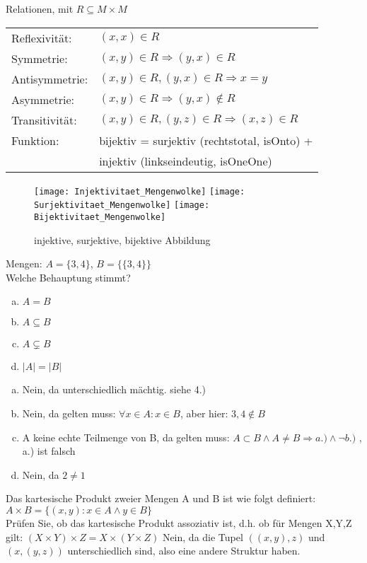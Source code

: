 \begin{card}
	Relationen, mit $R \subseteq M \times M$\\
	\begin{tabular}{ll}
		Reflexivität:& $(x, x) \in R $\\
		Symmetrie:&	$(x, y) \in R \Rightarrow (y, x) \in R$\\
		Antisymmetrie:& $(x, y) \in R, (y, x) \in R \Rightarrow x=y$\\
		Asymmetrie:& $(x, y) \in R \Rightarrow (y, x) \notin R$\\
		Transitivität:& $(x, y) \in R, (y, z) \in R \Rightarrow (x, z) \in R$\\
		Funktion: & bijektiv = surjektiv (rechtstotal, isOnto) +\\
	     	      & injektiv (linkseindeutig, isOneOne)
		\end{tabular}
		\begin{figure}[h]
		\centering
		\texttt{[image: Injektivitaet\_Mengenwolke]}
		\texttt{[image: Surjektivitaet\_Mengenwolke]}
		\texttt{[image: Bijektivitaet\_Mengenwolke]}
		\caption{injektive, surjektive, bijektive Abbildung}
		\end{figure}
\end{card}

\begin{card}
	Mengen: $A = \{3, 4\}$, $B = \{\{3, 4\}\}$\\Welche Behauptung stimmt?
	\begin{enumerate}[a)]
	\item $A = B$
	\item $A \subseteq B$
	\item $A \subsetneq B$
	\item $|A| = |B|$
	\end{enumerate}
	\hr
	\begin{enumerate}[a)]
	\item Nein, da unterschiedlich mächtig. siehe 4.)
	\item Nein, da gelten muss: $\forall x \in A: x \in B$, aber hier: $3,4 \notin B$
	\item A keine echte Teilmenge von B, da gelten muss: $A \subset B \land A \neq B \Rightarrow a.) \land \lnot b.)$ , a.) ist falsch
	\item Nein, da $2 \neq 1$
	\end{enumerate}
\end{card}

\begin{card}
	Das kartesische Produkt zweier Mengen A und B ist wie folgt definiert:
	$A \times B = \{(x,y):x	\in	A \land	y \in B\}$\\
	Prüfen Sie, ob das kartesische Produkt assoziativ ist, d.h. ob für Mengen X,Y,Z gilt:
	$(X	\times Y)\times Z=X \times(Y \times Z)$
	\hr
	Nein, da die Tupel $((x,y),z)$ und $(x,(y,z))$ unterschiedlich sind, also eine andere Struktur haben.
\end{card}

